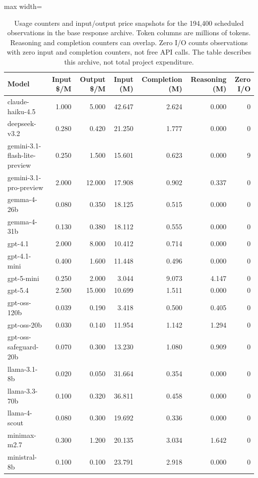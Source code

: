\begin{table}[htbp]
\centering\small
\caption{Usage counters and input/output price snapshots for the 194{,}400 scheduled observations in the base response archive. Token columns are millions of tokens. Reasoning and completion counters can overlap. Zero I/O counts observations with zero input and completion counters, not free API calls. The table describes this archive, not total project expenditure.}
\label{tab:cost-breakdown}
\begin{adjustbox}{max width=\linewidth}
\begin{tabular}{lrrrrrr}
\toprule
Model & Input \$/M & Output \$/M & Input (M) & Completion (M) & Reasoning (M) & Zero I/O \\
\midrule
claude-haiku-4.5 & 1.000 & 5.000 & 42.647 & 2.624 & 0.000 & 0 \\
deepseek-v3.2 & 0.280 & 0.420 & 21.250 & 1.777 & 0.000 & 0 \\
gemini-3.1-flash-lite-preview & 0.250 & 1.500 & 15.601 & 0.623 & 0.000 & 9 \\
gemini-3.1-pro-preview & 2.000 & 12.000 & 17.908 & 0.902 & 0.337 & 0 \\
gemma-4-26b & 0.080 & 0.350 & 18.125 & 0.515 & 0.000 & 0 \\
gemma-4-31b & 0.130 & 0.380 & 18.112 & 0.555 & 0.000 & 0 \\
gpt-4.1 & 2.000 & 8.000 & 10.412 & 0.714 & 0.000 & 0 \\
gpt-4.1-mini & 0.400 & 1.600 & 11.448 & 0.496 & 0.000 & 0 \\
gpt-5-mini & 0.250 & 2.000 & 3.044 & 9.073 & 4.147 & 0 \\
gpt-5.4 & 2.500 & 15.000 & 10.699 & 1.511 & 0.000 & 0 \\
gpt-oss-120b & 0.039 & 0.190 & 3.418 & 0.500 & 0.405 & 0 \\
gpt-oss-20b & 0.030 & 0.140 & 11.954 & 1.142 & 1.294 & 0 \\
gpt-oss-safeguard-20b & 0.070 & 0.300 & 13.230 & 1.080 & 0.909 & 0 \\
llama-3.1-8b & 0.020 & 0.050 & 31.664 & 0.354 & 0.000 & 0 \\
llama-3.3-70b & 0.100 & 0.320 & 36.811 & 0.458 & 0.000 & 0 \\
llama-4-scout & 0.080 & 0.300 & 19.692 & 0.336 & 0.000 & 0 \\
minimax-m2.7 & 0.300 & 1.200 & 20.135 & 3.034 & 1.642 & 0 \\
ministral-8b & 0.100 & 0.100 & 23.791 & 2.918 & 0.000 & 0 \\

\end{tabular}
\end{adjustbox}
\end{table}
